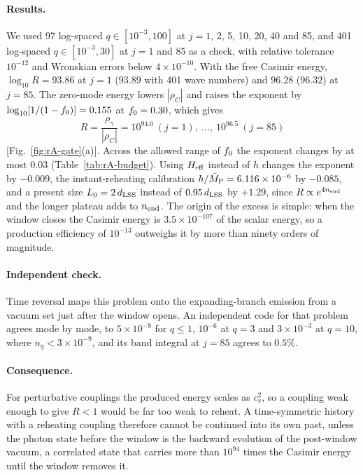 \paragraph{Results.}
We used 97 log-spaced $q\in[10^{-3},100]$ at $j=1$, 2, 5, 10, 20, 40 and 85, and 401 log-spaced $q\in[10^{-3},30]$ at $j=1$ and 85 as a check, with relative tolerance $10^{-12}$ and Wronskian errors below $4\times10^{-10}$. %
With the free Casimir energy, $\log_{10}R=93.86$ at $j=1$ ($93.89$ with 401 wave numbers) and $96.28$ ($96.32$) at $j=85$. %
The zero-mode energy lowers $|\rho_C|$ and raises the exponent by $\log_{10}[1/(1-f_0)]=0.155$ at $f_0=0.30$, which gives
\begin{equation}
R=\frac{\rho_\gamma}{|\rho_C|}=10^{94.0}\ (j=1),\ \ldots,\ 10^{96.5}\ (j=85)
\label{eq:rA-windowR}
\end{equation} %
[Fig.~\ref{fig:rA-gate}(a)].
Across the allowed range of $f_0$ the exponent changes by at most $0.03$ (Table~\ref{tab:rA-budget}). %
Using $H_{\mathrm{eff}}$ instead of $h$ changes the exponent by $-0.009$, the instant-reheating calibration $h/\bar M_{\mathrm{P}}=6.116\times10^{-6}$ by $-0.085$, and a present size $L_0=2\,d_{\mathrm{LSS}}$ instead of $0.95\,d_{\mathrm{LSS}}$ by $+1.29$, since $R\propto e^{4n_{\rm end}}$ and the longer plateau adds to $n_{\rm end}$. %
The origin of the excess is simple: when the window closes the Casimir energy is $3.5\times10^{-107}$ of the scalar energy, so a production efficiency of $10^{-13}$ outweighs it by more than ninety orders of magnitude. %

\paragraph{Independent check.}
Time reversal maps this problem onto the expanding-branch emission from a vacuum set just after the window opens.
An independent code for that problem agrees mode by mode, to $5\times10^{-8}$ for $q\leq1$, $10^{-6}$ at $q=3$ and $3\times10^{-3}$ at $q=10$, where $n_q<3\times10^{-9}$, and its band integral at $j=85$ agrees to $0.5\%$. %

\paragraph{Consequence.}
For perturbative couplings the produced energy scales as $c_v^2$, so a coupling weak enough to give $R<1$ would be far too weak to reheat.
A time-symmetric history with a reheating coupling therefore cannot be continued into its own past, unless the photon state before the window is the backward evolution of the post-window vacuum, a correlated state that carries more than $10^{94}$ times the Casimir energy until the window removes it. %

